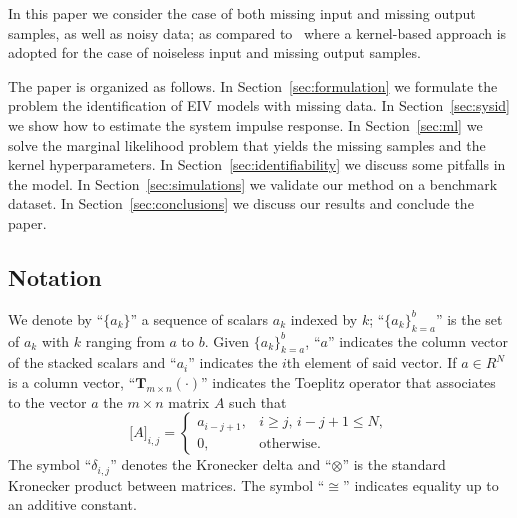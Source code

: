 \documentclass[10pt]{article}
\newcommand{\T}{\mathbf{T}}
\begin{document}
In this paper we consider the case of both missing input and missing output
samples, as well as noisy data; as compared to~\cite{pillonetto2009bayesian}
where a kernel-based approach is adopted for the case of noiseless input and
missing output samples.

The paper is organized as follows. In Section~\ref{sec:formulation} we
formulate the problem the identification of EIV models with missing data. In
Section~\ref{sec:sysid} we show how to estimate the system impulse response. In
Section~\ref{sec:ml} we solve the marginal likelihood problem that yields the
missing samples and the kernel hyperparameters. In
Section~\ref{sec:identifiability} we discuss some pitfalls in the model. In
Section~\ref{sec:simulations} we validate our method on a benchmark dataset. In
Section~\ref{sec:conclusions} we discuss our results and conclude the paper.

\subsection{Notation}
We denote by ``$\{a_k\}$'' a sequence of scalars $a_k$ indexed by $k$;
``${\{a_k\}}_{k=a}^{b}$''
is the set of $a_k$ with $k$ ranging from $a$ to $b$. Given
${\{a_k\}}_{k=a}^{b}$,
``$a$'' indicates the column vector of the stacked scalars and
``$a_i$'' indicates the $i$th element of said vector. If $a\in R^{N}$ is a column
vector, ``$\T_{m\times n}(\cdot)$'' indicates the Toeplitz operator that associates
to the vector $a$ the $m\times n$ matrix $A$ such that
\begin{equation}
  {\big[A\big]}_{i,j} =
    \begin{cases}
    a_{i-j+1}, & i\geq j,\, i-j+1\leq N,\\
    0, & \text{otherwise}.
\end{cases}
\end{equation}
The symbol ``$\delta_{i,j}$'' denotes the Kronecker delta and ``$\otimes$'' is the
standard Kronecker product between matrices. The symbol ``$\cong$'' indicates
equality up to an additive constant.
\end{document}
